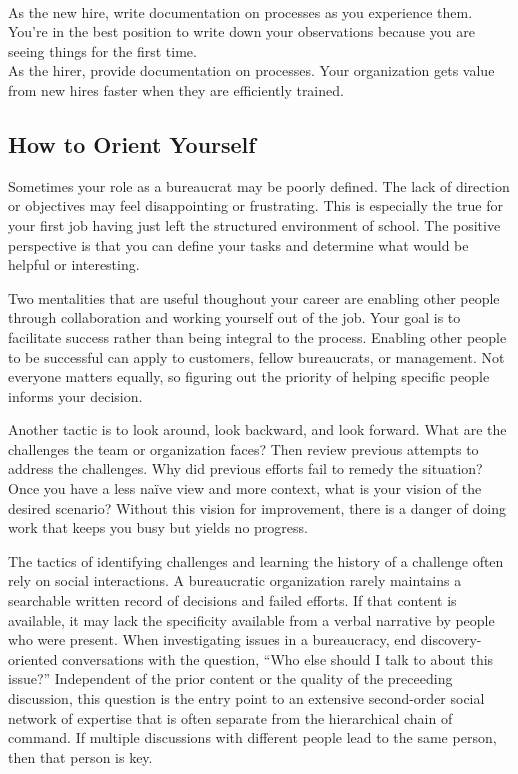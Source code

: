 \ \\
\begin{minipage}{\textwidth}
As the new hire, write documentation on processes as you experience them. You're in the best position to write down your observations because you are seeing things for the first time.\\
As the hirer, provide documentation on processes. Your organization gets value from new hires faster when they are efficiently trained. 
\end{minipage}

\subsection*{How to Orient Yourself}

Sometimes your role as a bureaucrat may be poorly defined. The lack of direction or objectives may feel disappointing or frustrating. This is especially the true for your first job having just left the structured environment of school. The positive perspective is that you can define your tasks and determine what would be helpful or interesting. 

Two mentalities that are useful thoughout your career are enabling other people through collaboration and working yourself out of the job. Your goal is to facilitate success rather than being integral to the process. Enabling other people to be successful can apply to customers, fellow bureaucrats, or management. Not everyone matters equally, so figuring out the priority of helping specific people informs your decision. 

Another tactic is to look around, look backward, and look forward. What are the challenges the team or organization faces? Then review previous attempts to address the challenges. Why did previous efforts fail to remedy the situation? Once you have a less na\"ive view and more context, what is your vision of the desired scenario? Without this vision for improvement, there is a danger of doing work that keeps you busy but yields no progress. 

The tactics of identifying challenges and learning the history of a challenge often rely on social interactions. A bureaucratic organization rarely maintains a searchable written record of decisions and failed efforts. If that content is available, it may lack the specificity available from a verbal narrative by people who were present. When investigating issues in a bureaucracy, end discovery-oriented conversations with the question, ``Who else should I talk to about this issue?'' Independent of the prior content or the quality of the preceeding discussion, this question is the entry point to an extensive second-order social network of expertise that is often separate from the hierarchical chain of command. If multiple  discussions with different people lead to the same person, then that person is key. 

